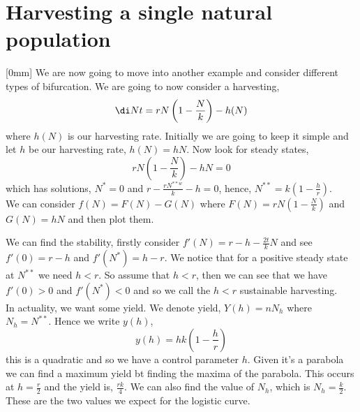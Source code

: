 \section{Harvesting a single natural population}
[0mm]
We are now going to move into another example and consider different types of bifurcation. We are going to now consider a harvesting,
$$ \di N t = rN \left( 1 - \frac{N }{k} \right) - h(N) $$
where $h(N)$ is our harvesting rate. Initially we are going to keep it simple and let $h$ be our harvesting rate, $h(N) = hN$. Now look for steady states,
$$ rN \left( 1 - \frac{N }{k}\right) - hN = 0 $$
which has solutions, $N^* = 0$ and $r - \frac{rN^{**w}}{k} - h =0$, hence, $N^{**} = k\left( 1 - \frac{h }{r} \right)$. \\
We can consider $f(N) = F(N) - G(N)$ where $F(N) = rN \left( 1 - \frac{N }{k} \right)$ and $G(N) = hN$ and then plot them.

\begin{figure}[!ht]
\centering
{}
\caption{}
\end{figure}

\noindent
We can find the stability, firstly consider $f'(N) = r - h - \frac{2t }{k}N$ and see $f'(0) = r - h$ and $f'(N^*) = h - r$. We notice that for a positive steady state at $N^{**}$ we need $h < r$. So assume that $h < r$, then we can see that we have $f'(0) > 0$ and $f'(N^{*}) < 0$ and so we call the $h < r$ sustainable harvesting. \\
In actuality, we want some yield. We denote yield, $Y(h) = nN_h$ where $N_h = N^{**}$. Hence we write $y(h)$,
$$ y(h) = hk\left( 1 - \frac{h}{r}\right) $$
this is a quadratic and so we have a control parameter $h$. Given it's a parabola we can find a maximum yield bt finding the maxima of the parabola. This occurs at $h = \frac{r }{2}$ and the yield is, $\frac{rk}{4}$. We can also find the value of $N_h$, which is $N_h = \frac{k}{2}$. These are the two values we expect for the logistic curve. \\

